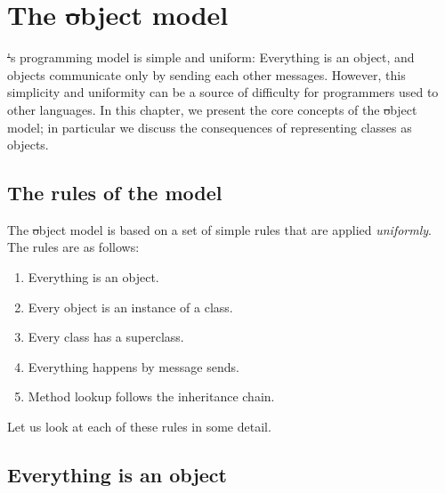 \documentclass[a4paper,10pt,twoside]{book}
\begin{document}
	\renewcommand{\nnbb}[2]{} %
\fi
\chapter{The \st object model}
\label{cha:SqueakModel}\label{cha:model}

\st's programming model is simple and uniform:
Everything is an object, and objects communicate only by sending each other messages.
However, this simplicity and uniformity can be a source of difficulty for programmers used to other languages.
In this chapter, we present the core concepts of the \st object model; in particular we discuss the consequences of representing classes as objects.

\section{The rules of the model}
\label{sec:rules}

The \st object model is based on a set of simple rules that are applied \emph{uniformly}.
The rules are as follows:

\begin{enumerate}[label={\textbf{Rule \arabic{*}}.}, ref={Rule \arabic{*}}, leftmargin=*]
\item{} \label{rule:everything}
	Everything is an object.

\item{} \label{rule:instance}
	Every object is an instance of a class.

\item{}  \label{rule:inheritance}
	Every class has a superclass.

\item{}  \label{rule:message}
	Everything happens by message sends.

\item{}  \label{rule:lookup}
	Method lookup follows the inheritance chain.

\end{enumerate}

\noindent
Let us look at each of these rules in some detail.


\section{Everything is an object}
\end{document}
